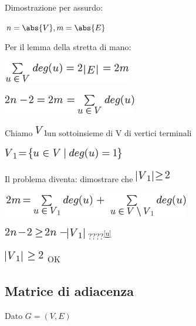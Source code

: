 \documentclass{article}
\begin{document}
{}

{Dimostrazione per assurdo:}

$n=\abs{V},m=\abs{E}$

{Per il lemma della stretta di mano:}

\includegraphics{images/image377.png}

\includegraphics{images/image378.png}

{Chiamo }\includegraphics{images/image379.png}{un sottoinsieme di V di
vertici terminali}

\includegraphics{images/image380.png}

{Il problema diventa: dimostrare che
}\includegraphics{images/image381.png}

\includegraphics{images/image382.png}

\includegraphics{images/image383.png}{????}\textsuperscript{\protect\hyperlink{cmnt21}{{[}u{]}}}

\includegraphics{images/image384.png}{~OK}

{}

{}

\hypertarget{h.viqjw1dxzez8}{\subsection{\texorpdfstring{{Matrice di
adiacenza }}{Matrice di adiacenza }}\label{h.viqjw1dxzez8}}

{Dato }$G=(V,E)${~}
\end{document}
